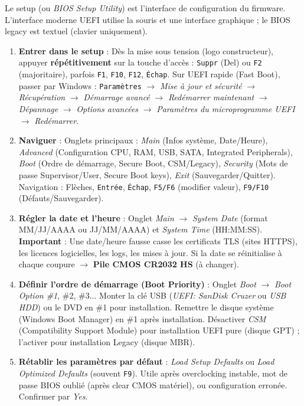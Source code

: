 \documentclass[11pt]{article}
\newcommand{\cle}[1]{{\popxbold\color{popdark}#1}}
\begin{document}
\begin{methode}
Le \cle{setup} (ou \emph{BIOS Setup Utility}) est l'interface de configuration du firmware. L'interface moderne UEFI utilise la souris et une interface graphique ; le BIOS legacy est textuel (clavier uniquement).
\begin{enumerate}
\item \textbf{Entrer dans le setup} : Dès la mise sous tension (logo constructeur), appuyer \textbf{répétitivement} sur la touche d'accès : \texttt{Suppr} (Del) ou \texttt{F2} (majoritaire), parfois \texttt{F1}, \texttt{F10}, \texttt{F12}, \texttt{Échap}. Sur UEFI rapide (Fast Boot), passer par Windows : \texttt{Paramètres} $\rightarrow$ \emph{Mise à jour et sécurité} $\rightarrow$ \emph{Récupération} $\rightarrow$ \emph{Démarrage avancé} $\rightarrow$ \emph{Redémarrer maintenant} $\rightarrow$ \emph{Dépannage} $\rightarrow$ \emph{Options avancées} $\rightarrow$ \emph{Paramètres du microprogramme UEFI} $\rightarrow$ \emph{Redémarrer}.
\item \textbf{Naviguer} : Onglets principaux : \emph{Main} (Infos système, Date/Heure), \emph{Advanced} (Configuration CPU, RAM, USB, SATA, Integrated Peripherals), \emph{Boot} (Ordre de démarrage, Secure Boot, CSM/Legacy), \emph{Security} (Mots de passe Supervisor/User, Secure Boot keys), \emph{Exit} (Sauvegarder/Quitter). Navigation : Flèches, \texttt{Entrée}, \texttt{Échap}, \texttt{F5/F6} (modifier valeur), \texttt{F9/F10} (Défauts/Sauvegarder).
\item \textbf{Régler la date et l'heure} : Onglet \emph{Main} $\rightarrow$ \emph{System Date} (format MM/JJ/AAAA ou JJ/MM/AAAA) et \emph{System Time} (HH:MM:SS). \textbf{Important} : Une date/heure fausse casse les certificats TLS (sites HTTPS), les licences logicielles, les logs, les mises à jour. Si la date se réinitialise à chaque coupure $\rightarrow$ \textbf{Pile CMOS CR2032 HS} (à changer).
\item \textbf{Définir l'ordre de démarrage (Boot Priority)} : Onglet \emph{Boot} $\rightarrow$ \emph{Boot Option \#1}, \#2, \#3... Monter la clé USB (\emph{UEFI: SanDisk Cruzer} ou \emph{USB HDD}) ou le DVD en \#1 pour installation. Remettre le disque système (Windows Boot Manager) en \#1 après installation. Désactiver \emph{CSM} (Compatibility Support Module) pour installation UEFI pure (disque GPT) ; l'activer pour installation Legacy (disque MBR).
\item \textbf{Rétablir les paramètres par défaut} : \emph{Load Setup Defaults} ou \emph{Load Optimized Defaults} (souvent \texttt{F9}). Utile après overclocking instable, mot de passe BIOS oublié (après clear CMOS matériel), ou configuration erronée. Confirmer par \emph{Yes}.

\end{enumerate}
\end{methode}
\end{document}
